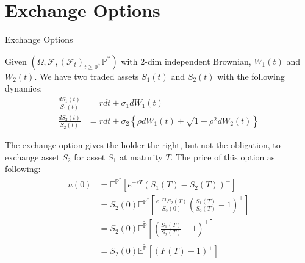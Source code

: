 \documentclass{beamer}
\begin{document}
\section{Exchange Options}
\begin{frame}{Exchange Options}

    {\footnotesize \footnotesize
    \par Given $(\Omega, \mathcal{F}, (\mathcal{F}_t)_{t \geq 0}, \mathbb{P}^*)$ 
    with 2-dim independent Brownian, \( W_1(t) \) and \( W_2(t) \). 
    We have two traded assets \( S_1(t) \) and \( S_2(t) \) with the following dynamics:
    \begin{align*}
    \frac{dS_1(t)}{S_1(t)} &= rdt + \sigma_1 dW_1(t) \\
    \frac{dS_2(t)}{S_2(t)} &= rdt + \sigma_2 \left\{ \rho dW_1(t) + \sqrt{1 - \rho^2} dW_2(t) \right\}
    \end{align*}\pause
    \par The exchange option gives the holder the right, but not the obligation, 
    to exchange asset \(S_2\) for asset \(S_1\) at maturity \(T\). The price of this option as following:
    \begin{align*}
        u(0) &= \mathbb{E}^{\mathbb{P}^*}\left[e^{-rT}(S_1(T) - S_2(T))^+\right]\\
        &=S_2(0) \mathbb{E}^{\mathbb{P}^*}\left[ \frac{e^{-rT} S_2(T)}{S_2(0)} \left( \frac{S_1(T)}{S_2(T)} - 1 \right)^+ \right] \\
        &= S_2(0) \mathbb{E}^{\tilde{\mathbb{P}}} \left[ \left( \frac{S_1(T)}{S_2(T)} - 1 \right)^+ \right] \\
        &= S_2(0) \mathbb{E}^{\tilde{\mathbb{P}}} \left[ (F(T) - 1)^+ \right]
    \end{align*}

    }
\end{frame}
\end{document}
